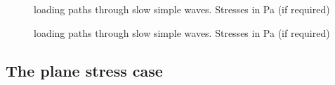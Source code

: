 \begin{figure}[h!]
  \centering
  \caption{loading paths through slow simple waves. Stresses in Pa (if required)}
  \label{fig:slow_path_plane_strains}
\end{figure}


\begin{figure}[h!]
  \centering
  \caption{loading paths through slow simple waves. Stresses in Pa (if required)}
  \label{fig:slow_path_plane_strains}
\end{figure}







\subsection{The plane stress case}






